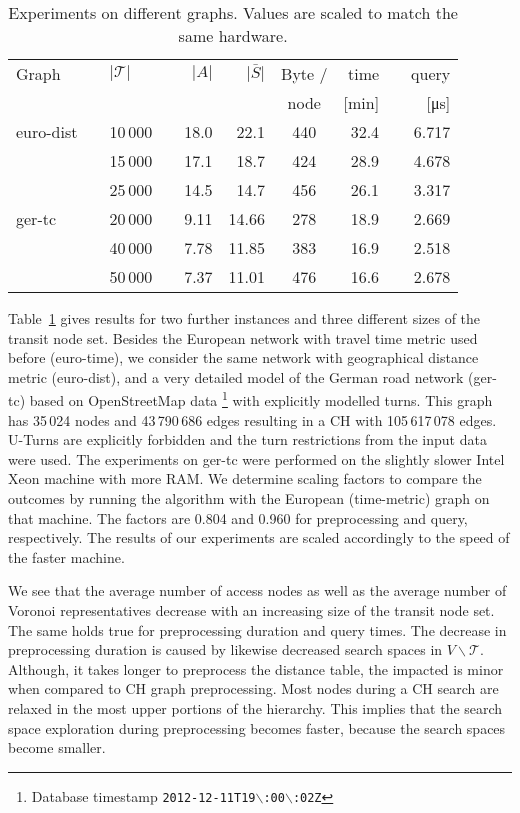 \documentclass{llncs}
\begin{document}
\begin{table}[h]
\caption{Experiments on different graphs. Values are scaled to match the same hardware.}
\label{tab:experimentsGraphs}
\centering
\begin{tabular}{lclcrrcrrr}
\toprule 
Graph 	& 		& $\vert\mathcal{T}\vert$ & & $\vert A\vert$ & $\vert\bar{S} \vert$ & Byte $/$ & time 		 &	& query \\ 
 	& 	& 	&  &  & & node & [\si{\minute}]  &	& [\si{\micro\second}] \\ 
\midrule
euro-dist	& & 10\,000 & & 18.0 & 22.1 & 440 & 32.4 & & 6.717 \\
	 		& & 15\,000 & & 17.1 & 18.7 & 424 & 28.9 & & 4.678 \\
	 		& & 25\,000 & & 14.5 & 14.7 & 456 & 26.1 & & 3.317 \\
\midrule
ger-tc		& & 20\,000 & & 9.11 & 14.66 & 278 & 18.9 & & 2.669 \\
			& & 40\,000 & & 7.78 & 11.85 & 383 & 16.9 & & 2.518 \\
			& & 50\,000 & & 7.37 & 11.01 & 476 & 16.6 & & 2.678 \\
\bottomrule 
\end{tabular}
\end{table}

Table~\ref{tab:experimentsGraphs} gives results for two further instances and three different sizes of the transit node set. Besides the European network with travel time metric used before (euro-time), we consider the same network with geographical distance metric (euro-dist), and a very detailed model of the German road network (ger-tc) based on OpenStreetMap data \footnote{Database timestamp \texttt{2012-12-11T19$\backslash$:00$\backslash$:02Z} } with explicitly modelled turns. 
This graph has 35\,024 nodes and 43\,790\,686 edges resulting in a CH with 105\,617\,078 edges.
U-Turns are explicitly forbidden and the turn restrictions from the input data were used.
The experiments on ger-tc were performed on the slightly slower Intel Xeon machine with more RAM. 
We determine scaling factors to compare the outcomes by running the algorithm with the European (time-metric) graph on that machine. 
The factors are 0.804 and 0.960 for preprocessing and query, respectively. 
The results of our experiments are scaled accordingly to the speed of the faster machine.

We see that the average number of access nodes as well as the average number of Voronoi representatives decrease with an increasing size of the transit node set.
The same holds true for preprocessing duration and query times.
The decrease in preprocessing duration is caused by likewise decreased search spaces in $V\backslash\mathcal{T}$.
Although, it takes longer to preprocess the distance table, the impacted is minor when compared to CH graph preprocessing.
Most nodes during a CH search are relaxed in the most upper portions of the hierarchy.
This implies that the search space exploration during preprocessing becomes faster, because the search spaces become smaller.
\end{document}
